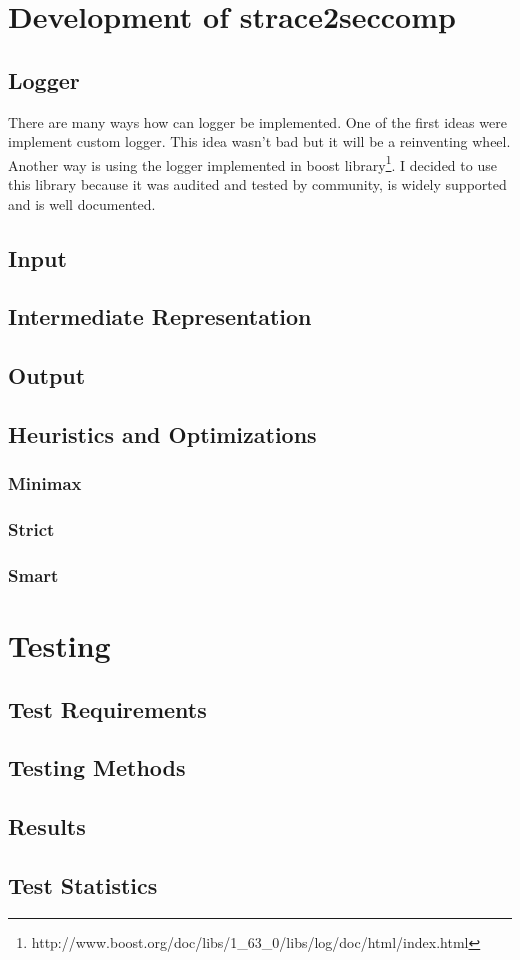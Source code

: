 \chapter{Development of strace2seccomp}
\section{Logger}
There are many ways how can logger be implemented.
One of the first ideas were implement custom logger.
This idea wasn't bad but it will be a reinventing wheel.
Another way is using the logger implemented in boost library\footnote{http://www.boost.org/doc/libs/1\_63\_0/libs/log/doc/html/index.html}.
I decided to use this library because it was audited and tested by community, is widely supported and is well documented.
\section{Input}
\section{Intermediate Representation}
\section{Output}
\section{Heuristics and Optimizations}
\subsection{Minimax}
\subsection{Strict}
\subsection{Smart}


\chapter{Testing}
\section{Test Requirements}
\section{Testing Methods}
\section{Results}
\section{Test Statistics}


